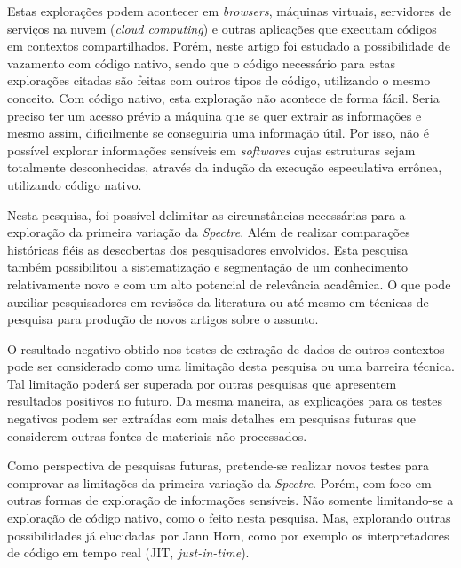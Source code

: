 \documentclass[
	article,			    %
	12pt,				    %
	oneside,			    %
	a4paper,			    %
	chapter=TITLE,		    %
	section=TITLE,		    %
	subsection=TITLE,	    %
	english,			    %
	brazil,				    %
	sumario=tradicional
]{abntex2}
\begin{document}
Estas explorações podem acontecer em \emph{browsers}, máquinas virtuais, servidores de serviços na nuvem (\emph{cloud computing}) e outras aplicações que executam códigos em contextos compartilhados. Porém, neste artigo foi estudado a possibilidade de vazamento com código nativo, sendo que o código necessário para estas explorações citadas são feitas com outros tipos de código, utilizando o mesmo conceito. Com código nativo, esta exploração não acontece de forma fácil. Seria preciso ter um acesso prévio a máquina que se quer extrair as informações e mesmo assim, dificilmente se conseguiria uma informação útil. Por isso, não é possível explorar informações sensíveis em \emph{softwares} cujas estruturas sejam totalmente desconhecidas, através da indução da execução especulativa errônea, utilizando código nativo.

Nesta pesquisa, foi possível delimitar as circunstâncias necessárias para a exploração da primeira variação da \emph{Spectre}. Além de realizar comparações históricas fiéis as descobertas dos pesquisadores envolvidos. Esta pesquisa também possibilitou a sistematização e segmentação de um conhecimento relativamente novo e com um alto potencial de relevância acadêmica. O que pode auxiliar pesquisadores em revisões da literatura ou até mesmo em técnicas de pesquisa para produção de novos artigos sobre o assunto.

O resultado negativo obtido nos testes de extração de dados de outros contextos pode ser considerado como uma limitação desta pesquisa ou uma barreira técnica. Tal limitação poderá ser superada por outras pesquisas que apresentem resultados positivos no futuro. Da mesma maneira, as explicações para os testes negativos podem ser extraídas com mais detalhes em pesquisas futuras que considerem outras fontes de materiais não processados.

Como perspectiva de pesquisas futuras, pretende-se realizar novos testes para comprovar as limitações da primeira variação da \emph{Spectre}. Porém, com foco em outras formas de exploração de informações sensíveis. Não somente limitando-se a exploração de código nativo, como o feito nesta pesquisa. Mas, explorando outras possibilidades já elucidadas por Jann Horn, como por exemplo os interpretadores de código em tempo real (JIT, \emph{just-in-time}).
\end{document}
